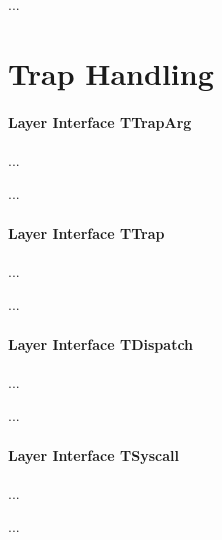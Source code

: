 ...

\section{Trap Handling}

\paragraph{Layer Interface TTrapArg}
...

...

\paragraph{Layer Interface TTrap}
...

...

\paragraph{Layer Interface TDispatch}
...

...

\paragraph{Layer Interface TSyscall}
...

...